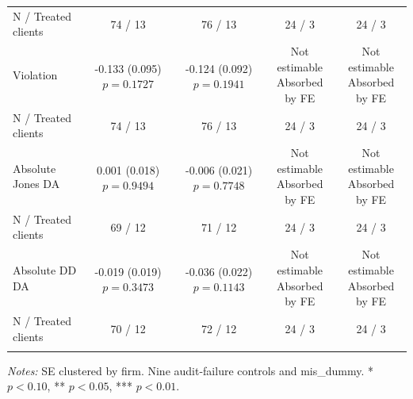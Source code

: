 \documentclass[10pt]{article}
\newcommand{\sym}[1]{\textsuperscript{#1}}
\begin{document}
\begin{tabular*}{\textwidth}{@{\extracolsep{\fill}}lcccc@{}}
N / Treated clients & 74 / 13 & 76 / 13 & 24 / 3 & 24 / 3 \\ \addlinespace
Violation & \shortstack{-0.133\sym{}\\(0.095)\\$p=0.1727$} & \shortstack{-0.124\sym{}\\(0.092)\\$p=0.1941$} & \shortstack{Not estimable\\Absorbed by FE} & \shortstack{Not estimable\\Absorbed by FE} \\
N / Treated clients & 74 / 13 & 76 / 13 & 24 / 3 & 24 / 3 \\ \addlinespace
Absolute Jones DA & \shortstack{0.001\sym{}\\(0.018)\\$p=0.9494$} & \shortstack{-0.006\sym{}\\(0.021)\\$p=0.7748$} & \shortstack{Not estimable\\Absorbed by FE} & \shortstack{Not estimable\\Absorbed by FE} \\
N / Treated clients & 69 / 12 & 71 / 12 & 24 / 3 & 24 / 3 \\ \addlinespace
Absolute DD DA & \shortstack{-0.019\sym{}\\(0.019)\\$p=0.3473$} & \shortstack{-0.036\sym{}\\(0.022)\\$p=0.1143$} & \shortstack{Not estimable\\Absorbed by FE} & \shortstack{Not estimable\\Absorbed by FE} \\
N / Treated clients & 70 / 12 & 72 / 12 & 24 / 3 & 24 / 3 \\ \addlinespace
\bottomrule
\end{tabular*}
\par\medskip\fontsize{9}{11}\selectfont\textit{Notes:} SE clustered by firm. Nine audit-failure controls and mis\_dummy. * $p<0.10$, ** $p<0.05$, *** $p<0.01$.
\end{document}
